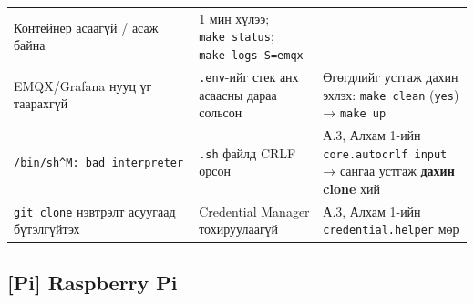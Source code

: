 \begin{longtable}[]{@{}lll@{}}
\begin{minipage}[t]{0.30\columnwidth}
Контейнер асаагүй / асаж байна\strut
\end{minipage} & \begin{minipage}[t]{0.30\columnwidth}\raggedright
1 мин хүлээ; \texttt{make\ status}; \texttt{make\ logs\ S=\allowbreak{}emqx}\strut
\end{minipage}\tabularnewline
\begin{minipage}[t]{0.30\columnwidth}\raggedright
EMQX/Grafana нууц үг таарахгүй\strut
\end{minipage} & \begin{minipage}[t]{0.30\columnwidth}\raggedright
\texttt{.env}-ийг стек анх асаасны дараа сольсон\strut
\end{minipage} & \begin{minipage}[t]{0.30\columnwidth}\raggedright
Өгөгдлийг устгаж дахин эхлэх: \texttt{make\ clean} (\texttt{yes}) → \texttt{make\ up}\strut
\end{minipage}\tabularnewline
\begin{minipage}[t]{0.30\columnwidth}\raggedright
\texttt{/bin/sh\^{}M:\ bad\ interpreter}\strut
\end{minipage} & \begin{minipage}[t]{0.30\columnwidth}\raggedright
\texttt{.sh} файлд CRLF орсон\strut
\end{minipage} & \begin{minipage}[t]{0.30\columnwidth}\raggedright
А.3, Алхам 1-ийн \texttt{core.\allowbreak{}autocrlf\ input} → сангаа устгаж \textbf{дахин clone} хий\strut
\end{minipage}\tabularnewline
\begin{minipage}[t]{0.30\columnwidth}\raggedright
\texttt{git\ clone} нэвтрэлт асуугаад бүтэлгүйтэх\strut
\end{minipage} & \begin{minipage}[t]{0.30\columnwidth}\raggedright
Credential Manager тохируулаагүй\strut
\end{minipage} & \begin{minipage}[t]{0.30\columnwidth}\raggedright
А.3, Алхам 1-ийн \texttt{credential.\allowbreak{}helper} мөр\strut
\end{minipage}\tabularnewline
\bottomrule
\end{longtable}\endgroup

\hypertarget{pi-raspberry-pi}{%
\subsection{{[}Pi{]} Raspberry Pi}\label{pi-raspberry-pi}}

